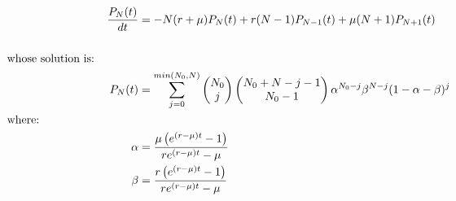 \documentclass[12pt]{article}
\begin{document}
\begin{align}
\frac{P_{N}(t)}{dt}  & = -N(r+\mu)P_{N}(t)+r(N-1)P_{N-1}(t)+\mu (N+1)P_{N+1}(t) \nonumber \\\nonumber \\
&    \hspace{-1.6in}  \text{whose solution is:} \nonumber \\
P_{N}(t) &= \sum_{j=0}^{min(N_{0}, N)} \begin{pmatrix} N_{0}\\j \end{pmatrix}
\begin{pmatrix} N_{0}+N-j-1\\N_{0}-1 \end{pmatrix} \alpha ^{N_{0}-j} \beta^{N-j} (1- \alpha - \beta)^j \nonumber \\
&    \hspace{-1.6in}  \text{where:} \nonumber \\
\alpha &= \frac{\mu \left( e^{(r-\mu)t} -1 \right)}{re^{(r-\mu)t} -\mu} \nonumber \\
\beta &= \frac{r \left( e^{(r-\mu)t} -1 \right)}{re^{(r-\mu)t} -\mu} \nonumber
\end{align} 
\end{document}
